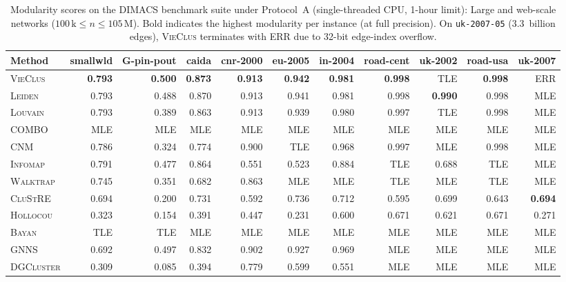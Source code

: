 \documentclass[11pt,a4paper]{article}
\begin{document}
\begin{table}[H]
    \centering
    \caption{Modularity scores on the \textsc{DIMACS} benchmark suite under Protocol~A (single-threaded CPU, 1-hour limit): Large and web-scale networks ($100\,\text{k} \le n \le 105\,\text{M}$). Bold indicates the highest modularity per instance (at full precision). On \texttt{uk-2007-05} ($3.3$~billion edges), \textsc{VieClus} terminates with \textsc{ERR} due to 32-bit edge-index overflow.}
    \label{tab:mod_dimacs_large}
    \vspace{0.5em}
    \small
    \setlength{\tabcolsep}{1.2pt}
    \begin{tabular*}{\textwidth}{@{\extracolsep{\fill}}l rrrrrrrrrr@{}}
        \toprule
        Method & smallwld & G-pin-pout & caida & cnr-2000 & eu-2005 & in-2004 & road-cent & uk-2002 & road-usa & uk-2007 \\
        \midrule
        \textsc{VieClus} & \textbf{0.793} & \textbf{0.500} & \textbf{0.873} & \textbf{0.913} & \textbf{0.942} & \textbf{0.981} & \textbf{0.998} & TLE & \textbf{0.998} & ERR \\
        \textsc{Leiden} & 0.793 & 0.488 & 0.870 & 0.913 & 0.941 & 0.981 & 0.998 & \textbf{0.990} & 0.998 & MLE \\
        \textsc{Louvain} & 0.793 & 0.389 & 0.863 & 0.913 & 0.939 & 0.980 & 0.997 & TLE & 0.998 & MLE \\
        \textsc{COMBO} & MLE & MLE & MLE & MLE & MLE & MLE & MLE & MLE & MLE & MLE \\
        \textsc{CNM} & 0.786 & 0.324 & 0.774 & 0.900 & TLE & 0.968 & 0.997 & MLE & 0.998 & MLE \\
        \textsc{Infomap} & 0.791 & 0.477 & 0.864 & 0.551 & 0.523 & 0.884 & TLE & 0.688 & TLE & MLE \\
        \textsc{Walktrap} & 0.745 & 0.351 & 0.682 & 0.863 & MLE & MLE & TLE & MLE & TLE & MLE \\
        \textsc{CluStRE} & 0.694 & 0.200 & 0.731 & 0.592 & 0.736 & 0.712 & 0.595 & 0.699 & 0.643 & \textbf{0.694} \\
        \textsc{Hollocou} & 0.323 & 0.154 & 0.391 & 0.447 & 0.231 & 0.600 & 0.671 & 0.621 & 0.671 & 0.271 \\
        \textsc{Bayan} & TLE & TLE & MLE & MLE & MLE & MLE & MLE & MLE & MLE & MLE \\
        \midrule
        \textsc{GNNS} & 0.692 & 0.497 & 0.832 & 0.902 & 0.927 & 0.969 & MLE & MLE & MLE & MLE \\
        \textsc{DGCluster} & 0.309 & 0.085 & 0.394 & 0.779 & 0.599 & 0.551 & MLE & MLE & MLE & MLE \\

\end{tabular*}
\end{table}
\end{document}
